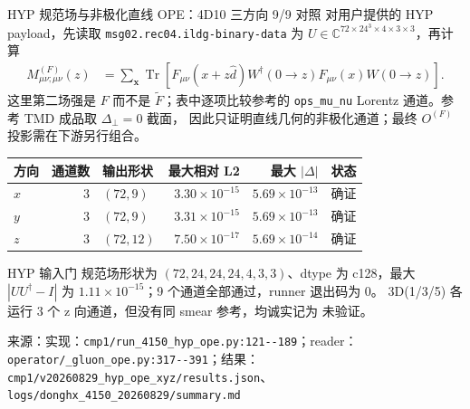 \documentclass[UTF8,aspectratio=169,11pt]{ctexbeamer}
\newcommand{\source}[1]{\vspace{0.05em}\par{\raggedright\scriptsize\color{muted}来源：#1\par}}
\newcommand{\codepath}[1]{\nolinkurl{#1}}
\newcommand{\verified}{\textcolor{evidence}{确证}}
\newcommand{\unverified}{\textcolor{warning}{未验证}}
\begin{document}
\begin{frame}[t]{HYP 规范场与非极化直线 OPE：4D10 三方向 9/9 对照}
  \footnotesize
  对用户提供的 HYP payload，先读取
  \codepath{msg02.rec04.ildg-binary-data} 为
  $U\in\mathbb C^{72\times24^3\times4\times3\times3}$，再计算
  \begin{align*}
    M^{(F)}_{\mu\nu;\mu\nu}(z)&=\sum_{\boldsymbol x}\operatorname{Tr}\!\left[
      F_{\mu\nu}(x+z\hat d)W^\dagger(0\!\to\!z)F_{\mu\nu}(x)W(0\!\to\!z)\right].
  \end{align*}
  这里第二场强是 $F$ 而不是 $\widetilde F$；表中逐项比较参考的
  \codepath{ops_mu_nu} Lorentz 通道。参考 TMD 成品取 $\Delta_\perp=0$ 截面，
  因此只证明直线几何的非极化通道；最终 $O^{(F)}$ 投影需在下游另行组合。
  \vspace{0.10em}
  \setlength{\tabcolsep}{3pt}
  \renewcommand{\arraystretch}{1.02}
  \begin{tabular}{@{}l r l r r l@{}}
    \toprule
    方向 & 通道数 & 输出形状 & 最大相对 L2 & 最大 $|\Delta|$ & 状态\\
    \midrule
    $x$ & 3 & $(72,9)$ & $3.30\times10^{-15}$ & $5.69\times10^{-13}$ & \verified\\
    $y$ & 3 & $(72,9)$ & $3.31\times10^{-15}$ & $5.69\times10^{-13}$ & \verified\\
    $z$ & 3 & $(72,12)$ & $7.50\times10^{-17}$ & $5.69\times10^{-14}$ & \verified\\
    \bottomrule
  \end{tabular}
  \vspace{0.08em}
  \begin{block}{HYP 输入门}
    规范场形状为 $(72,24,24,24,4,3,3)$、dtype 为 c128，最大 $|UU^\dagger-I|$ 为
    $1.11\times10^{-15}$；9 个通道全部通过，runner 退出码为 0。
    3D(1/3/5) 各运行 3 个 z 向通道，但没有同 smear 参考，均诚实记为 \unverified。
  \end{block}
  \source{实现：\codepath{cmp1/run_4150_hyp_ope.py:121--189}；reader：\codepath{operator/_gluon_ope.py:317--391}；结果：\codepath{cmp1/v20260829_hyp_ope_xyz/results.json}、\codepath{logs/donghx_4150_20260829/summary.md}}
\end{frame}
\end{document}
